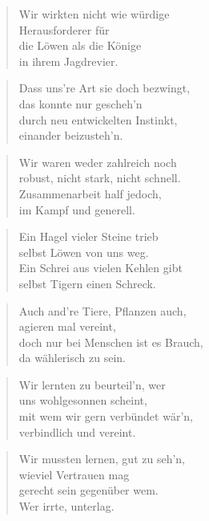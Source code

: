 \documentclass[10pt,a4paper]{article}
\begin{document}
\begin{multicols}{2}
\begin{verse}
Wir wirkten nicht wie würdige \\
Herausforderer für \\
die Löwen als die Könige \\
in ihrem Jagdrevier. \\
\end{verse}

\begin{verse}
Dass uns’re Art sie doch bezwingt, \\
das konnte nur gescheh’n \\
durch neu entwickelten Instinkt, \\
einander beizusteh’n. \\
\end{verse}

\begin{verse}
Wir waren weder zahlreich noch \\
robust, nicht stark, nicht schnell. \\
Zusammenarbeit half jedoch, \\
im Kampf und generell. \\
\end{verse}

\begin{verse}
Ein Hagel vieler Steine trieb \\
selbst Löwen von uns weg. \\
Ein Schrei aus vielen Kehlen gibt \\
selbst Tigern einen Schreck. \\
\end{verse}

\begin{verse}
Auch and’re Tiere, Pflanzen auch, \\
agieren mal vereint, \\
doch nur bei Menschen ist es Brauch, \\
da wählerisch zu sein. \\
\end{verse}

\begin{verse}
Wir lernten zu beurteil’n, wer \\
uns wohlgesonnen scheint, \\
mit wem wir gern verbündet wär’n, \\
verbindlich und vereint. \\
\end{verse}

\begin{verse}
Wir mussten lernen, gut zu seh’n, \\
wieviel Vertrauen mag \\
gerecht sein gegenüber wem. \\
Wer irrte, unterlag. \\
\end{verse}


\end{multicols}
\end{document}
